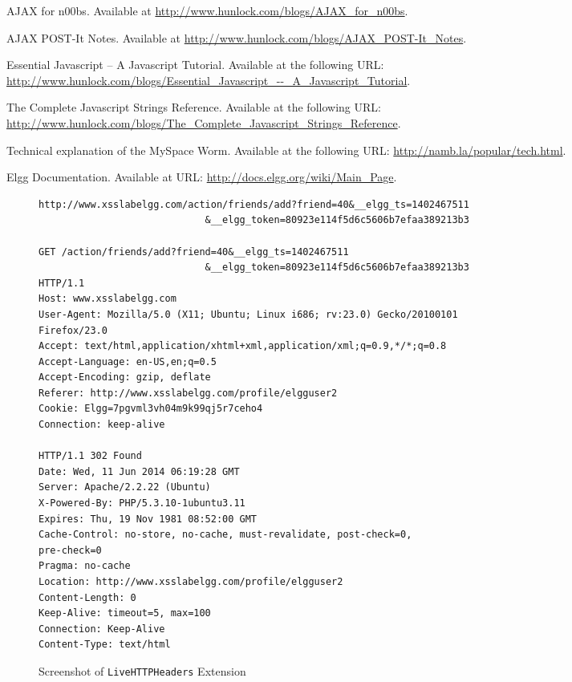 \begin{thebibliography}{10}

\newblock AJAX for n00bs. Available at {\footnotesize \url{http://www.hunlock.com/blogs/AJAX_for_n00bs}}.

\newblock AJAX POST-It Notes.
\newblock Available at {\footnotesize \url{http://www.hunlock.com/blogs/AJAX_POST-It_Notes}}.

\newblock Essential Javascript -- A Javascript Tutorial.
\newblock Available at the following URL:\\
{\footnotesize \url{http://www.hunlock.com/blogs/Essential_Javascript_--_A_Javascript_Tutorial}}.

\newblock The Complete Javascript Strings Reference.
\newblock Available at the following URL:\\
{\footnotesize \url{http://www.hunlock.com/blogs/The_Complete_Javascript_Strings_Reference}}.

\newblock Technical explanation of the MySpace Worm.
\newblock Available at the following URL: \url{http://namb.la/popular/tech.html}.

\newblock Elgg Documentation. Available at URL: \url{http://docs.elgg.org/wiki/Main_Page}.

\end{thebibliography}


\begin{figure}[b]
{\footnotesize
\begin{Verbatim}[frame=single]
http://www.xsslabelgg.com/action/friends/add?friend=40&__elgg_ts=1402467511
                             &__elgg_token=80923e114f5d6c5606b7efaa389213b3

GET /action/friends/add?friend=40&__elgg_ts=1402467511
                             &__elgg_token=80923e114f5d6c5606b7efaa389213b3
HTTP/1.1
Host: www.xsslabelgg.com
User-Agent: Mozilla/5.0 (X11; Ubuntu; Linux i686; rv:23.0) Gecko/20100101
Firefox/23.0
Accept: text/html,application/xhtml+xml,application/xml;q=0.9,*/*;q=0.8
Accept-Language: en-US,en;q=0.5
Accept-Encoding: gzip, deflate
Referer: http://www.xsslabelgg.com/profile/elgguser2
Cookie: Elgg=7pgvml3vh04m9k99qj5r7ceho4
Connection: keep-alive

HTTP/1.1 302 Found
Date: Wed, 11 Jun 2014 06:19:28 GMT
Server: Apache/2.2.22 (Ubuntu)
X-Powered-By: PHP/5.3.10-1ubuntu3.11
Expires: Thu, 19 Nov 1981 08:52:00 GMT
Cache-Control: no-store, no-cache, must-revalidate, post-check=0,
pre-check=0
Pragma: no-cache
Location: http://www.xsslabelgg.com/profile/elgguser2
Content-Length: 0
Keep-Alive: timeout=5, max=100
Connection: Keep-Alive
Content-Type: text/html
\end{Verbatim}
}
\caption{Screenshot of {\tt LiveHTTPHeaders} Extension} 
\label{fig:livehttptext}
\end{figure}

